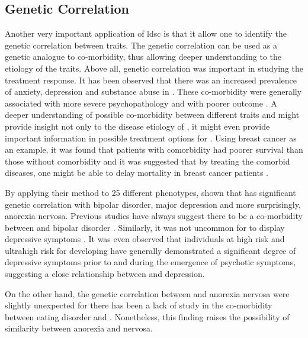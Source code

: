 	\subsection{Genetic Correlation}
	Another very important application of \gls{ldsc} is that it allow one to identify the genetic correlation between traits\citep{Bulik-Sullivan2015a}. 
	The genetic correlation can be used as a genetic analogue to co-morbidity, thus allowing deeper understanding to the etiology of the traits.
	Above all, genetic correlation was important in studying the treatment response. 
	It has been observed that there was an increased prevalence of anxiety, depression and substance abuse in  \citep{Buckley2009}. 
	These co-morbidity were generally associated with more severe psychopathology and with poorer outcome \citep{Buckley2009}.
	A deeper understanding of possible co-morbidity between different traits and  might provide insight not only to the disease etiology of , it might even provide important information in possible treatment options for . 
	Using breast cancer as an example, it was found that patients with comorbidity had poorer survival than those without comorbidity \citep{Sogaard2013} and it was suggested that by treating the comorbid diseases, one might be able to delay mortality in breast cancer patients \citep{Ording2013}.
		
	By applying their method to 25 different phenotypes, \citet{Bulik-Sullivan2015a} shown that  has significant genetic correlation with bipolar disorder, major depression and more surprisingly, anorexia nervosa.
	Previous studies have always suggest there to be a co-morbidity between  and bipolar disorder \citep{Lichtenstein2009,Purcell2009,Buckley2009}.
	Similarly, it was not uncommon for  to display depressive symptoms \citep{Buckley2009}. 
	It was even observed that individuals at high risk and ultrahigh risk for developing  have generally demonstrated a significant degree of depressive symptoms prior to and during the emergence of psychotic symptoms, suggesting a close relationship between  and depression. 
	
	On the other hand, the genetic correlation between  and anorexia nervosa were slightly unexpected for there has been a lack of study in the co-morbidity between eating disorder and . 
	Nonetheless, this finding raises the possibility of similarity between anorexia and nervosa.
